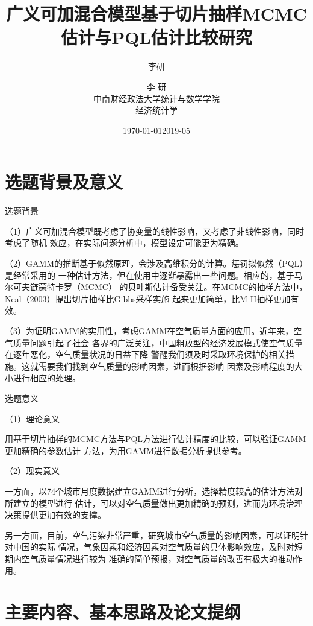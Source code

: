 \documentclass[ignorenonframetext,11pt,xcolor=dvipsnames,aspectratio=1610,hyperref={bookmarksdepth=4}]{beamer}
\author{李研}
\date{\today}
\date{2019-05}
\author[李\; 研(中南财经政法大学统计与数学学院)]{\CJKfamily{kai} 李 \enspace 研 \\ 中南财经政法大学统计与数学学院 \\ 经济统计学}
\title{广义可加混合模型基于切片抽样MCMC估计与PQL估计比较研究}
\begin{document}
\frame{\titlepage}

\section{选题背景及意义}

\begin{frame}{选题背景}

（1）广义可加混合模型既考虑了协变量的线性影响，又考虑了非线性影响，同时考虑了随机
效应，在实际问题分析中，模型设定可能更为精确。

（2）GAMM的推断基于似然原理，会涉及高维积分的计算。惩罚拟似然（PQL）是经常采用的
一种估计方法，但在使用中逐渐暴露出一些问题。相应的，基于马尔可夫链蒙特卡罗（MCMC）
的贝叶斯估计备受关注。在MCMC的抽样方法中，Neal（2003）提出切片抽样比Gibbs采样实施
起来更加简单，比M-H抽样更加有效。

（3）为证明GAMM的实用性，考虑GAMM在空气质量方面的应用。近年来，空气质量问题引起了社会
各界的广泛关注，中国粗放型的经济发展模式使空气质量在逐年恶化，空气质量状况的日益下降
警醒我们须及时采取环境保护的相关措施。这就需要我们找到空气质量的影响因素，进而根据影响
因素及影响程度的大小进行相应的处理。

\end{frame}

\begin{frame}{选题意义}

（1）理论意义

用基于切片抽样的MCMC方法与PQL方法进行估计精度的比较，可以验证GAMM更加精确的参数估计
方法，为用GAMM进行数据分析提供参考。

（2）现实意义

一方面，以74个城市月度数据建立GAMM进行分析，选择精度较高的估计方法对所建立的模型进行
估计，可以对空气质量做出更加精确的预测，进而为环境治理决策提供更加有效的支撑。

另一方面，目前，空气污染非常严重，研究城市空气质量的影响因素，可以证明针对中国的实际
情况，气象因素和经济因素对空气质量的具体影响效应，及时对短期内空气质量情况进行较为
准确的简单预报，对空气质量的改善有极大的推动作用。

\end{frame}

\section{主要内容、基本思路及论文提纲}
\end{document}
